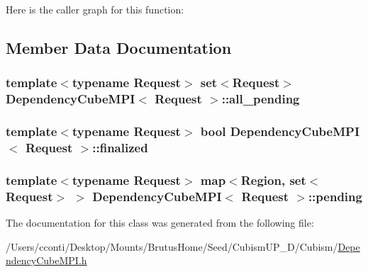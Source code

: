 Here is the caller graph for this function\+:




\subsection{Member Data Documentation}
\hypertarget{class_dependency_cube_m_p_i_a4996ead8bdfbf954562d0177b6c24607}{}
\subsubsection[{all\+\_\+pending}]{\setlength{\rightskip}{0pt plus 5cm}template$<$typename Request$>$ set$<$Request$>$ {\bf Dependency\+Cube\+M\+P\+I}$<$ Request $>$\+::all\+\_\+pending}\label{class_dependency_cube_m_p_i_a4996ead8bdfbf954562d0177b6c24607}
\hypertarget{class_dependency_cube_m_p_i_a79cbdbeafcdad83edcfe7bfb786e8dbb}{}
\subsubsection[{finalized}]{\setlength{\rightskip}{0pt plus 5cm}template$<$typename Request$>$ bool {\bf Dependency\+Cube\+M\+P\+I}$<$ Request $>$\+::finalized}\label{class_dependency_cube_m_p_i_a79cbdbeafcdad83edcfe7bfb786e8dbb}
\hypertarget{class_dependency_cube_m_p_i_a15e719dff5340ab953286ba4b9301a54}{}
\subsubsection[{pending}]{\setlength{\rightskip}{0pt plus 5cm}template$<$typename Request$>$ map$<${\bf Region}, set$<$Request$>$ $>$ {\bf Dependency\+Cube\+M\+P\+I}$<$ Request $>$\+::pending}\label{class_dependency_cube_m_p_i_a15e719dff5340ab953286ba4b9301a54}


The documentation for this class was generated from the following file\+:\begin{DoxyCompactItemize}
\item 
/\+Users/cconti/\+Desktop/\+Mounts/\+Brutus\+Home/\+Seed/\+Cubism\+U\+P\+\_\+D/\+Cubism/\hyperlink{_dependency_cube_m_p_i_8h}{Dependency\+Cube\+M\+P\+I.\+h}\end{DoxyCompactItemize}
